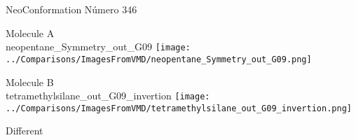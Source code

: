 \vtab[-3cm]
\begin{center}
{\large NeoConformation \tab Número 346}
\end{center}
\begin{multicols}{2}
\begin{center}
Molecule A \\ 
neopentane\_Symmetry\_out\_G09
\texttt{[image: ../Comparisons/ImagesFromVMD/neopentane\_Symmetry\_out\_G09.png]}
\\
\vtab

\columnbreak
Molecule B \\ 
tetramethylsilane\_out\_G09\_invertion
\texttt{[image: ../Comparisons/ImagesFromVMD/tetramethylsilane\_out\_G09\_invertion.png]}
\\
\vtab


\end{center}
\end{multicols}
\begin{center}
\textcolor{NavyBlue}{\Large Different}
\end{center}

 \newpage

